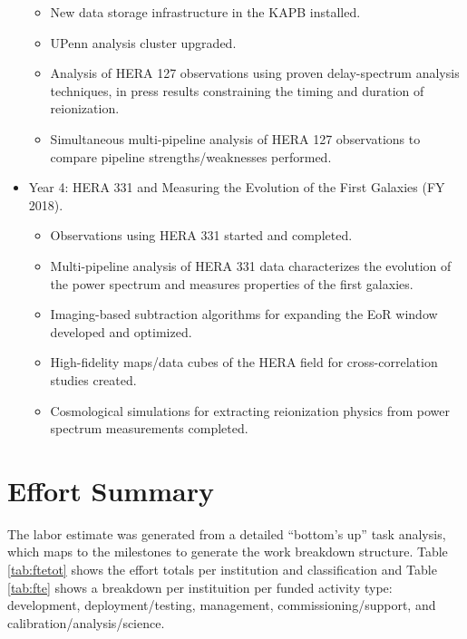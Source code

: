 \documentclass[preprint]{aastex}
\begin{document}
\begin{itemize}[itemsep=-4pt,parsep=0pt]
\begin{itemize}[itemsep=-4pt]
\item New data storage infrastructure in the KAPB installed.
\item UPenn analysis cluster upgraded. 
\item Analysis of HERA 127 observations using proven delay-spectrum analysis techniques, in press results constraining the timing and duration of reionization. 
\item Simultaneous multi-pipeline analysis of HERA 127 observations to compare pipeline strengths/weaknesses performed.
\end{itemize}
\item Year 4:  HERA 331 and Measuring the Evolution of the First Galaxies (FY 2018). 
\begin{itemize}[itemsep=-4pt]
\item Observations using HERA 331 started and completed.
\item Multi-pipeline analysis of HERA 331 data characterizes the evolution of the power spectrum and measures properties of the first galaxies. 
\item Imaging-based subtraction algorithms for expanding the EoR window developed and optimized.
\item High-fidelity maps/data cubes of the HERA field for cross-correlation studies created.
\item Cosmological simulations for extracting reionization physics from power spectrum measurements completed.
\end{itemize}
\end{itemize}

\section{Effort Summary}
\label{sec:wbs}
The labor estimate was generated from a detailed ``bottom's up'' task analysis, which maps to the milestones to generate the work breakdown structure.  Table \ref{tab:ftetot} shows the effort totals per institution and classification and Table \ref{tab:fte} shows a breakdown per instituition per funded activity type:   development, deployment/testing, management, commissioning/support, and calibration/analysis/science.
\end{document}
